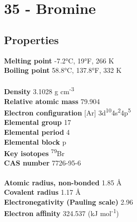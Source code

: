 \section{35 - Bromine}
\label{sec:elem-bromine}
\subsection{Properties}
\textbf{Melting point} -7.2°C, 19°F, 266 K\\
\textbf{Boiling point} 58.8°C, 137.8°F, 332 K\\
\\
\textbf{Density} 3.1028 g cm\textsuperscript{-3}\\
\textbf{Relative atomic mass} 79.904\\
\textbf{Electron configuration} [Ar] 3d\textsuperscript{10}4s\textsuperscript{2}4p\textsuperscript{5}\\
\textbf{Elemental group} 17\\
\textbf{Elemental period} 4\\
\textbf{Elemental block} p\\
\textbf{Key isotopes} \textsuperscript{79}Br\\
\textbf{CAS number} 7726-95-6\\
\\
\textbf{Atomic radius, non-bonded} 1.85 Å\\
\textbf{Covalent radius} 1.17 Å\\
\textbf{Electronegativity (Pauling scale)} 2.96\\
\textbf{Electron affinity} 324.537 (kJ mol\textsuperscript{-1})\\